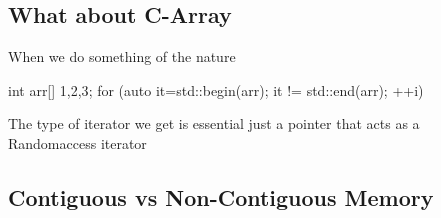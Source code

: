 \documentclass{report}
\begin{document}
    \bigbreak \noindent 
    \subsection{What about C-Array}
    \bigbreak \noindent 
    When we do something of the nature
    \bigbreak \noindent 
    \begin{cppcode}
        int arr[] {1,2,3};
        for (auto it=std::begin(arr); it != std::end(arr); ++i) { }
    \end{cppcode}
    \bigbreak \noindent 
    The type of iterator we get is essential just a pointer that acts as a Randomaccess iterator

    \pagebreak
    \subsection{Contiguous vs Non-Contiguous Memory}
    \bigbreak \noindent 
\end{document}
